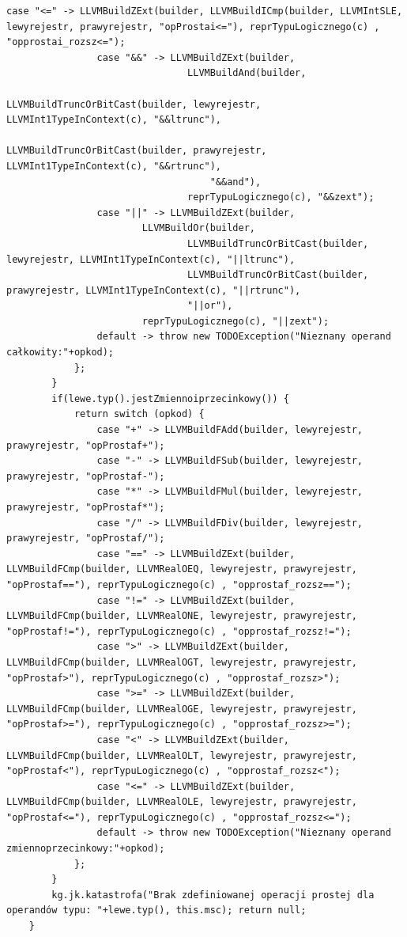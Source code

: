 \begin{lstlisting}[basicstyle=\scriptsize]
                case "<=" -> LLVMBuildZExt(builder, LLVMBuildICmp(builder, LLVMIntSLE, lewyrejestr, prawyrejestr, "opProstai<="), reprTypuLogicznego(c) , "opprostai_rozsz<=");
                case "&&" -> LLVMBuildZExt(builder,
                                LLVMBuildAnd(builder,
                                        LLVMBuildTruncOrBitCast(builder, lewyrejestr, LLVMInt1TypeInContext(c), "&&ltrunc"),
                                        LLVMBuildTruncOrBitCast(builder, prawyrejestr, LLVMInt1TypeInContext(c), "&&rtrunc"),
                                    "&&and"),
                                reprTypuLogicznego(c), "&&zext");
                case "||" -> LLVMBuildZExt(builder,
                        LLVMBuildOr(builder,
                                LLVMBuildTruncOrBitCast(builder, lewyrejestr, LLVMInt1TypeInContext(c), "||ltrunc"),
                                LLVMBuildTruncOrBitCast(builder, prawyrejestr, LLVMInt1TypeInContext(c), "||rtrunc"),
                                "||or"),
                        reprTypuLogicznego(c), "||zext");
                default -> throw new TODOException("Nieznany operand całkowity:"+opkod);
            };
        }
        if(lewe.typ().jestZmiennoiprzecinkowy()) {
            return switch (opkod) {
                case "+" -> LLVMBuildFAdd(builder, lewyrejestr, prawyrejestr, "opProstaf+");
                case "-" -> LLVMBuildFSub(builder, lewyrejestr, prawyrejestr, "opProstaf-");
                case "*" -> LLVMBuildFMul(builder, lewyrejestr, prawyrejestr, "opProstaf*");
                case "/" -> LLVMBuildFDiv(builder, lewyrejestr, prawyrejestr, "opProstaf/");
                case "==" -> LLVMBuildZExt(builder, LLVMBuildFCmp(builder, LLVMRealOEQ, lewyrejestr, prawyrejestr, "opProstaf=="), reprTypuLogicznego(c) , "opprostaf_rozsz==");
                case "!=" -> LLVMBuildZExt(builder, LLVMBuildFCmp(builder, LLVMRealONE, lewyrejestr, prawyrejestr, "opProstaf!="), reprTypuLogicznego(c) , "opprostaf_rozsz!=");
                case ">" -> LLVMBuildZExt(builder, LLVMBuildFCmp(builder, LLVMRealOGT, lewyrejestr, prawyrejestr, "opProstaf>"), reprTypuLogicznego(c) , "opprostaf_rozsz>");
                case ">=" -> LLVMBuildZExt(builder, LLVMBuildFCmp(builder, LLVMRealOGE, lewyrejestr, prawyrejestr, "opProstaf>="), reprTypuLogicznego(c) , "opprostaf_rozsz>=");
                case "<" -> LLVMBuildZExt(builder, LLVMBuildFCmp(builder, LLVMRealOLT, lewyrejestr, prawyrejestr, "opProstaf<"), reprTypuLogicznego(c) , "opprostaf_rozsz<");
                case "<=" -> LLVMBuildZExt(builder, LLVMBuildFCmp(builder, LLVMRealOLE, lewyrejestr, prawyrejestr, "opProstaf<="), reprTypuLogicznego(c) , "opprostaf_rozsz<=");
                default -> throw new TODOException("Nieznany operand zmiennoprzecinkowy:"+opkod);
            };
        }
        kg.jk.katastrofa("Brak zdefiniowanej operacji prostej dla operandów typu: "+lewe.typ(), this.msc); return null;
    } 
\end{lstlisting}
